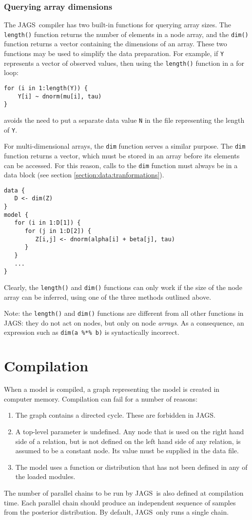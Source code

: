 \documentclass[11pt, a4paper, titlepage]{report}
\newcommand{\JAGS}{\textsf{JAGS}}
\begin{document}
\subsubsection*{Querying array dimensions}  

The \JAGS\ compiler has two built-in functions for querying array
sizes.  The \verb+length()+ function returns the number of elements in
a node array, and the \verb+dim()+ function returns a vector
containing the dimensions of an array.  These two functions may be
used to simplify the data preparation. For example, if \verb+Y+
represents a vector of observed values, then using the \verb+length()+
function in a for loop:
\begin{verbatim}
for (i in 1:length(Y)) {
    Y[i] ~ dnorm(mu[i], tau)
}
\end{verbatim}
avoids the need to put a separate data value \verb+N+ in the file
representing the length of \verb+Y+.  

For multi-dimensional arrays, the \verb+dim+ function serves a similar
purpose. The \verb+dim+ function returns a vector, which must be stored
in an array before its elements can be accessed. For this reason, calls
to the \verb+dim+ function must always be in a data block (see section
\ref{section:data:tranformations}).
\begin{verbatim}
data {
   D <- dim(Z)
}
model {
   for (i in 1:D[1]) {
      for (j in 1:D[2]) {
         Z[i,j] <- dnorm(alpha[i] + beta[j], tau)
      }
   }
   ...
}
\end{verbatim}
Clearly, the \verb+length()+ and \verb+dim()+ functions can only
work if the size of the node array can be inferred, using one of the
three methods outlined above.

Note: the \verb+length()+ and \verb+dim()+ functions are different
from all other functions in \JAGS: they do not act on nodes, but only
on node {\em arrays}. As a consequence, an expression such as
\verb+dim(a %*% b)+ is syntactically incorrect.

\section{Compilation}

When a model is compiled, a graph representing the model is created in
computer memory. Compilation can fail for a number of reasons:
\begin{enumerate}
\item The graph contains a directed cycle.  These are forbidden
in \JAGS.
\item A top-level parameter is undefined. Any node that is used on
the right hand side of a relation, but is not defined on the left
hand side of any relation, is assumed to be a constant node. Its value
must be supplied in the data file. 
\item The model uses a function or distribution that has not been
defined in any of the loaded modules.
\end{enumerate}
The number of parallel chains to be run by \JAGS\ is also defined at
compilation time.  Each parallel chain should produce an independent
sequence of samples from the posterior distribution. By default,
\JAGS\ only runs a single chain.
\end{document}
